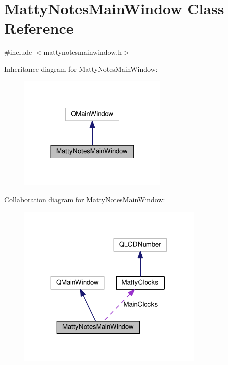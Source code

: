 \hypertarget{class_matty_notes_main_window}{}\section{Matty\+Notes\+Main\+Window Class Reference}
\label{class_matty_notes_main_window}


{\ttfamily \#include $<$mattynotesmainwindow.\+h$>$}



Inheritance diagram for Matty\+Notes\+Main\+Window\+:
\nopagebreak
\begin{figure}[H]
\begin{center}
\leavevmode
\includegraphics[width=204pt]{class_matty_notes_main_window__inherit__graph}
\end{center}
\end{figure}


Collaboration diagram for Matty\+Notes\+Main\+Window\+:
\nopagebreak
\begin{figure}[H]
\begin{center}
\leavevmode
\includegraphics[width=254pt]{class_matty_notes_main_window__coll__graph}
\end{center}
\end{figure}
